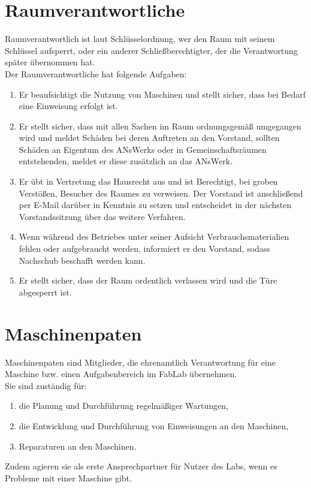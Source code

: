 \section{Raumverantwortliche}
Raumverantwortlich ist laut Schlüsselordnung, wer den Raum mit seinem Schlüssel aufsperrt, oder ein anderer Schließberechtigter, der die Verantwortung später übernommen hat. \\
Der Raumverantwortliche hat folgende Aufgaben:
\begin{enumerate}
  \item Er beaufsichtigt die Nutzung von Maschinen und stellt sicher, dass bei Bedarf eine Einweisung erfolgt ist. 
  \item Er stellt sicher, dass mit allen Sachen im Raum ordnungsgemäß umgegangen wird und meldet Schäden bei deren Auftreten an den Vorstand, sollten Schäden an Eigentum des ANsWerks oder in Gemeinschaftsräumen entstehenden, meldet er diese zusätzlich an das ANsWerk.
  \item Er übt in Vertretung das Hausrecht aus und ist Berechtigt, bei groben Verstößen, Besucher des Raumes zu verweisen. Der Vorstand ist anschließend per E-Mail darüber in Kenntnis zu setzen und entscheidet in der nächsten Vorstandssitzung über das weitere Verfahren.
  \item Wenn während des Betriebes unter seiner Aufsicht Verbrauchsmaterialien fehlen oder aufgebraucht werden, informiert er den Vorstand, sodass Nachschub beschafft werden kann.
  \item Er stellt sicher, dass der Raum ordentlich verlassen wird und die Türe abgesperrt ist. 
\end{enumerate}

\section{Maschinenpaten}
Maschinenpaten sind Mitglieder, die ehrenamtlich Verantwortung für eine Maschine bzw. einen Aufgabenbereich im FabLab übernehmen.\\
Sie sind zuständig für:
\begin{enumerate}
  \item die Planung und Durchführung regelmäßiger Wartungen,
  \item die Entwicklung und Durchführung von Einweisungen an den Maschinen,
  \item Reparaturen an den Maschinen.
\end{enumerate}

Zudem agieren sie als erste Ansprechpartner für Nutzer des Labs, wenn es Probleme mit einer Maschine gibt.

